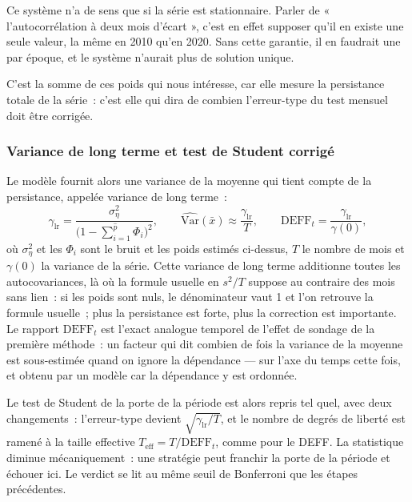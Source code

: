 Ce système n'a de sens que si la série est stationnaire. Parler de
« l'autocorrélation à deux mois d'écart », c'est en effet supposer qu'il en
existe une seule valeur, la même en 2010 qu'en 2020. Sans cette garantie, il
en faudrait une par époque, et le système n'aurait plus de solution unique.

C'est la somme de ces poids qui nous intéresse, car elle mesure la persistance
totale de la série~: c'est elle qui dira de combien l'erreur-type du test
mensuel doit être corrigée.

\subsubsection*{Variance de long terme et test de Student corrigé}

Le modèle fournit alors une variance de la moyenne qui tient compte de la
persistance, appelée variance de long terme~:
\[
  \gamma_{\mathrm{lr}}
     = \frac{\sigma^2_\eta}{\bigl(1-\sum_{i=1}^{\hat p}\Phi_i\bigr)^{2}},
  \qquad
  \widehat{\mathrm{Var}}(\bar x) \approx \frac{\gamma_{\mathrm{lr}}}{T},
  \qquad
  \mathrm{DEFF}_t = \frac{\gamma_{\mathrm{lr}}}{\gamma(0)},
\]
où \(\sigma^2_\eta\) et les \(\Phi_i\) sont le bruit et les poids estimés
ci-dessus, \(T\) le nombre de mois et \(\gamma(0)\) la variance de la série.
Cette variance de long
terme additionne toutes les autocovariances, là où la formule usuelle en
\(s^2/T\) suppose au contraire des mois sans lien~: si les poids sont nuls,
le dénominateur vaut 1 et l'on retrouve la formule usuelle~; plus la
persistance est forte, plus la correction est importante. Le rapport
\(\mathrm{DEFF}_t\) est l'exact analogue temporel de l'effet de sondage de la
première méthode~: un facteur qui dit combien de fois la variance de la
moyenne est sous-estimée quand on ignore la dépendance — sur l'axe du temps
cette fois, et obtenu par un modèle car la dépendance y est ordonnée.

Le test de Student de la porte de la période est alors repris tel quel, avec
deux changements~: l'erreur-type devient
\(\sqrt{\gamma_{\mathrm{lr}}/T}\), et le nombre de degrés de liberté est
ramené à la taille effective \(T_{\mathrm{eff}} = T/\mathrm{DEFF}_t\), comme
pour le DEFF. La statistique diminue mécaniquement~: une stratégie peut
franchir la porte de la période et échouer ici. Le verdict se lit au même
seuil de Bonferroni que les étapes précédentes.

